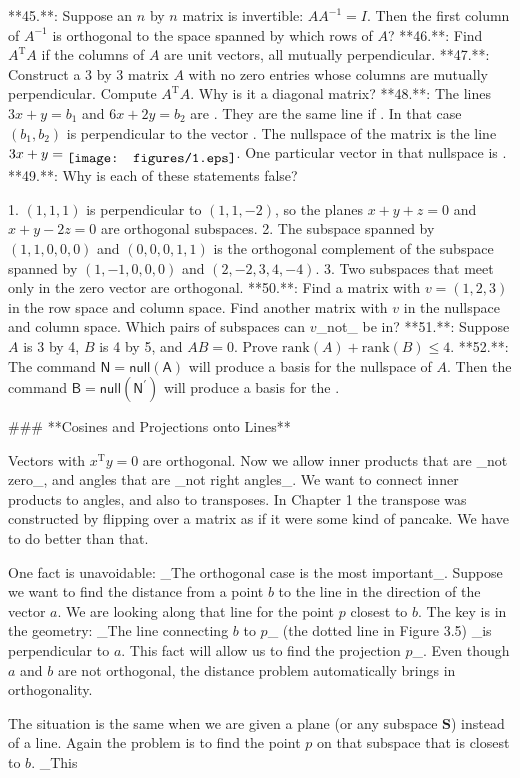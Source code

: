 

**45.**: Suppose an \(n\) by \(n\) matrix is invertible: \(AA^{-1}=I\). Then the first column of \(A^{-1}\) is orthogonal to the space spanned by which rows of \(A\)?
**46.**: Find \(A^{\mathrm{T}}A\) if the columns of \(A\) are unit vectors, all mutually perpendicular.
**47.**: Construct a 3 by 3 matrix \(A\) with no zero entries whose columns are mutually perpendicular. Compute \(A^{\mathrm{T}}A\). Why is it a diagonal matrix?
**48.**: The lines \(3x+y=b_{1}\) and \(6x+2y=b_{2}\) are . They are the same line if . In that case \((b_{1},b_{2})\) is perpendicular to the vector . The nullspace of the matrix is the line \(3x+y=\raisebox{-3.01pt}{\texttt{[image: figures/1.eps]}}\). One particular vector in that nullspace is .
**49.**: Why is each of these statements false?

1. \((1,1,1)\) is perpendicular to \((1,1,-2)\), so the planes \(x+y+z=0\) and \(x+y-2z=0\) are orthogonal subspaces.
2. The subspace spanned by \((1,1,0,0,0)\) and \((0,0,0,1,1)\) is the orthogonal complement of the subspace spanned by \((1,-1,0,0,0)\) and \((2,-2,3,4,-4)\).
3. Two subspaces that meet only in the zero vector are orthogonal.
**50.**: Find a matrix with \(v=(1,2,3)\) in the row space and column space. Find another matrix with \(v\) in the nullspace and column space. Which pairs of subspaces can \(v\)_not_ be in?
**51.**: Suppose \(A\) is 3 by 4, \(B\) is 4 by 5, and \(AB=0\). Prove \(\mathrm{rank}(A)+\mathrm{rank}(B)\leq 4\).
**52.**: The command \(\mathsf{N}=\mathsf{null}(\mathsf{A})\) will produce a basis for the nullspace of \(A\). Then the command \(\mathsf{B}=\mathsf{null}(\mathsf{N}^{\prime})\) will produce a basis for the .

### **Cosines and Projections onto Lines**

Vectors with \(x^{\mathrm{T}}y=0\) are orthogonal. Now we allow inner products that are _not zero_, and angles that are _not right angles_. We want to connect inner products to angles, and also to transposes. In Chapter 1 the transpose was constructed by flipping over a matrix as if it were some kind of pancake. We have to do better than that.

One fact is unavoidable: _The orthogonal case is the most important_. Suppose we want to find the distance from a point \(b\) to the line in the direction of the vector \(a\). We are looking along that line for the point \(p\) closest to \(b\). The key is in the geometry: _The line connecting \(b\) to \(p\)_ (the dotted line in Figure 3.5) _is perpendicular to \(a\). This fact will allow us to find the projection \(p\)_. Even though \(a\) and \(b\) are not orthogonal, the distance problem automatically brings in orthogonality.

The situation is the same when we are given a plane (or any subspace \(\mathbf{S}\)) instead of a line. Again the problem is to find the point \(p\) on that subspace that is closest to \(b\). _This